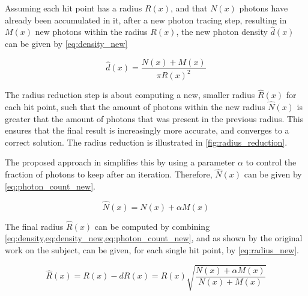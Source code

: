 \documentclass[main.tex]{subfiles}
\begin{document}
Assuming each hit point has a radius $R(x)$, and that $N(x)$ photons have already been accumulated in it, after a new photon tracing step, resulting in $M(x)$ new photons within the radius $R(x)$, the new photon density $\hat{d}(x)$ can be given by \cref{eq:density_new}

\begin{figure}[!htp]
  \begin{equation}
    \hat{d}(x) = \frac{N(x) + M(x)}{\pi R(x)^{2}}
  \label{eq:density_new}
  \end{equation}
\end{figure}

The radius reduction step is about computing a new, smaller radius $\hat{R}(x)$ for each hit point, such that the amount of photons within the new radius $\hat{N}(x)$ is greater that the amount of photons that was present in the previous radius. This ensures that the final result is increasingly more accurate, and converges to a correct solution. The radius reduction is illustrated in \cref{fig:radius_reduction}.

The proposed approach in \cite{hachisuka2008progressive} simplifies this by using a parameter $\alpha$ to control the fraction of photons to keep after an iteration. Therefore, $\hat{N}(x)$ can be given by \cref{eq:photon_count_new}.

\begin{figure}[!htp]
  \begin{equation}
    \hat{N}(x) = N(x) + \alpha M(x)
  \label{eq:photon_count_new}
  \end{equation}
\end{figure}



The final radius $\hat{R}(x)$ can be computed by combining \cref{eq:density,eq:density_new,eq:photon_count_new}, and as shown by the original work on the subject, can be given, for each single hit point, by \cref{eq:radius_new}.

\begin{figure}[!htp]
  \begin{equation}
    \hat{R}(x) = R(x) - dR(x) = R(x) \sqrt{\frac{N(x) + \alpha M(x)}{N(x) + M(x)}}
  \label{eq:radius_new}
  \end{equation}
\end{figure}
\end{document}
